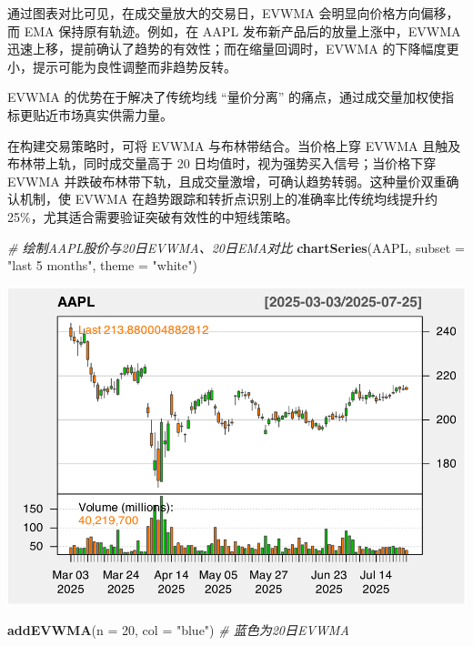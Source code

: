 \documentclass[]{ctexbook}
\newenvironment{Shaded}{\begin{snugshade}}{\end{snugshade}}
\newcommand{\AttributeTok}[1]{\textcolor[rgb]{0.13,0.29,0.53}{#1}}
\newcommand{\CommentTok}[1]{\textcolor[rgb]{0.56,0.35,0.01}{\textit{#1}}}
\newcommand{\DecValTok}[1]{\textcolor[rgb]{0.00,0.00,0.81}{#1}}
\newcommand{\FunctionTok}[1]{\textcolor[rgb]{0.13,0.29,0.53}{\textbf{#1}}}
\newcommand{\NormalTok}[1]{#1}
\newcommand{\StringTok}[1]{\textcolor[rgb]{0.31,0.60,0.02}{#1}}
\begin{document}
通过图表对比可见，在成交量放大的交易日，EVWMA 会明显向价格方向偏移，而 EMA 保持原有轨迹。例如，在 AAPL 发布新产品后的放量上涨中，EVWMA 迅速上移，提前确认了趋势的有效性；而在缩量回调时，EVWMA 的下降幅度更小，提示可能为良性调整而非趋势反转。

EVWMA 的优势在于解决了传统均线 ``量价分离'' 的痛点，通过成交量加权使指标更贴近市场真实供需力量。

在构建交易策略时，可将 EVWMA 与布林带结合。当价格上穿 EVWMA 且触及布林带上轨，同时成交量高于 20 日均值时，视为强势买入信号；当价格下穿 EVWMA 并跌破布林带下轨，且成交量激增，可确认趋势转弱。这种量价双重确认机制，使 EVWMA 在趋势跟踪和转折点识别上的准确率比传统均线提升约 25\%，尤其适合需要验证突破有效性的中短线策略。

\begin{Shaded}
\begin{Highlighting}[]
\CommentTok{\# 绘制AAPL股价与20日EVWMA、20日EMA对比}
\FunctionTok{chartSeries}\NormalTok{(AAPL, }\AttributeTok{subset =} \StringTok{"last 5 months"}\NormalTok{, }\AttributeTok{theme =} \StringTok{"white"}\NormalTok{)}
\end{Highlighting}
\end{Shaded}

\includegraphics[width=0.9\linewidth]{QuantmodHandbook_files/figure-latex/evwma_2-1}

\begin{Shaded}
\begin{Highlighting}[]
\FunctionTok{addEVWMA}\NormalTok{(}\AttributeTok{n =} \DecValTok{20}\NormalTok{, }\AttributeTok{col =} \StringTok{"blue"}\NormalTok{)   }\CommentTok{\# 蓝色为20日EVWMA}
\end{Highlighting}
\end{Shaded}
\end{document}
